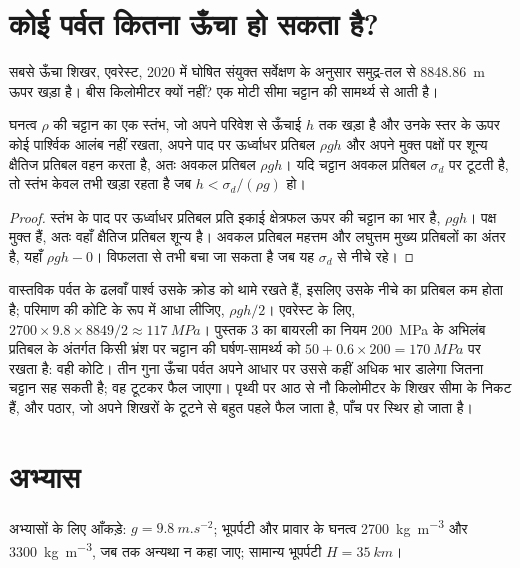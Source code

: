 \section{कोई पर्वत कितना ऊँचा हो सकता है?}\label{sec:b2:himalaya-andes:heights}

सबसे ऊँचा शिखर, एवरेस्ट, 2020 में घोषित संयुक्त सर्वेक्षण के अनुसार समुद्र-तल से \qty{8848.86}{m}
ऊपर खड़ा है। बीस किलोमीटर क्यों नहीं? एक मोटी सीमा चट्टान की सामर्थ्य से आती है।

\begin{proposition}[चट्टान की सामर्थ्य से ऊँचाई की एक सीमा]\label{prop:b2:himalaya-andes:height}
घनत्व $\rho$ की चट्टान का एक स्तंभ, जो अपने परिवेश से ऊँचाई $h$ तक खड़ा है और उनके स्तर के ऊपर
कोई पार्श्विक आलंब नहीं रखता, अपने पाद पर ऊर्ध्वाधर प्रतिबल $\rho g h$ और अपने मुक्त पक्षों पर शून्य
क्षैतिज प्रतिबल वहन करता है, अतः अवकल प्रतिबल $\rho g h$। यदि
चट्टान अवकल प्रतिबल $\sigma_d$ पर टूटती है, तो स्तंभ केवल तभी खड़ा रहता है जब $h < \sigma_d/(\rho
g)$ हो।
\end{proposition}

\begin{proof}
स्तंभ के पाद पर ऊर्ध्वाधर प्रतिबल प्रति इकाई क्षेत्रफल ऊपर की चट्टान का भार है,
$\rho g h$। पक्ष मुक्त हैं, अतः वहाँ क्षैतिज प्रतिबल शून्य है। अवकल
प्रतिबल महत्तम और लघुत्तम मुख्य प्रतिबलों का अंतर है, यहाँ $\rho g h - 0$।
विफलता से तभी बचा जा सकता है जब यह $\sigma_d$ से नीचे रहे।
\end{proof}

वास्तविक पर्वत के ढलवाँ पार्श्व उसके क्रोड को थामे रखते हैं, इसलिए उसके नीचे का प्रतिबल
कम होता है; परिमाण की कोटि के रूप में आधा लीजिए, $\rho g h/2$। एवरेस्ट के लिए, $2700 \times 9.8
\times 8849/2 \approx \qty{117}{MPa}$। पुस्तक 3 का बायरली का नियम \qty{200}{MPa} के अभिलंब प्रतिबल के अंतर्गत
किसी भ्रंश पर चट्टान की घर्षण-सामर्थ्य को $50 + 0.6 \times 200 =
\qty{170}{MPa}$ पर रखता है: वही कोटि। तीन गुना ऊँचा पर्वत अपने आधार पर उससे कहीं अधिक भार डालेगा
जितना चट्टान सह सकती है; वह टूटकर फैल जाएगा। पृथ्वी पर आठ से नौ किलोमीटर के शिखर
सीमा के निकट हैं, और पठार, जो अपने शिखरों के टूटने से बहुत पहले फैल जाता है, पाँच पर
स्थिर हो जाता है।

\section*{अभ्यास}\label{sec:b2:himalaya-andes:exercises}

अभ्यासों के लिए आँकड़े: $g = \qty{9.8}{m.s^{-2}}$; भूपर्पटी और प्रावार के घनत्व
\qty{2700}{kg.m^{-3}} और \qty{3300}{kg.m^{-3}}, जब तक अन्यथा न कहा जाए; सामान्य भूपर्पटी $H =
\qty{35}{km}$।

